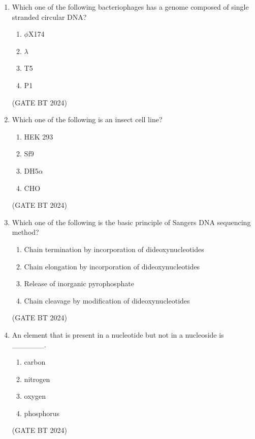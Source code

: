 \documentclass[journal,12pt,onecolumn]{IEEEtran}
\theoremstyle{remark}
\begin{document}
\begin{enumerate}
\item 
Which one of the following bacteriophages has a genome composed of single stranded circular DNA?
\begin{multicols}{2}
\begin{enumerate}
    \item $\phi$X174
    \item $\lambda$
    \item T5
    \item P1
\end{enumerate}
\end{multicols}
\hfill(GATE BT 2024)

\item 
Which one of the following is an insect cell line?
\begin{multicols}{2}
\begin{enumerate}
    \item HEK 293
    \item Sf9
    \item DH5$\alpha$
    \item CHO
\end{enumerate}
\end{multicols}
\hfill(GATE BT 2024)

\item 
Which one of the following is the basic principle of Sangers DNA sequencing method?

\begin{enumerate}
    \item Chain termination by incorporation of dideoxynucleotides
    \item Chain elongation by incorporation of dideoxynucleotides
    \item Release of inorganic pyrophosphate
    \item Chain cleavage by modification of dideoxynucleotides
\end{enumerate}
\hfill(GATE BT 2024)

\item 
An element that is present in a nucleotide but not in a nucleoside is \_\_\_\_\_\_.
\begin{multicols}{2}
\begin{enumerate}
    \item carbon
    \item nitrogen
    \item oxygen
    \item phosphorus
\end{enumerate}
\end{multicols}
\hfill(GATE BT 2024)


\end{enumerate}
\end{document}
